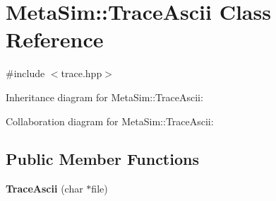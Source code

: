 \hypertarget{classMetaSim_1_1TraceAscii}{}\section{Meta\+Sim\+:\+:Trace\+Ascii Class Reference}
\label{classMetaSim_1_1TraceAscii}


{\ttfamily \#include $<$trace.\+hpp$>$}



Inheritance diagram for Meta\+Sim\+:\+:Trace\+Ascii\+:


Collaboration diagram for Meta\+Sim\+:\+:Trace\+Ascii\+:
\subsection*{Public Member Functions}
\begin{DoxyCompactItemize}
\item 
{\bfseries Trace\+Ascii} (char $\ast$file)\hypertarget{classMetaSim_1_1TraceAscii_acce00566dd076eb50a99f60ca9aa0f81}{}\label{classMetaSim_1_1TraceAscii_acce00566dd076eb50a99f60ca9aa0f81}

\end{DoxyCompactItemize}
{\bf }\par
